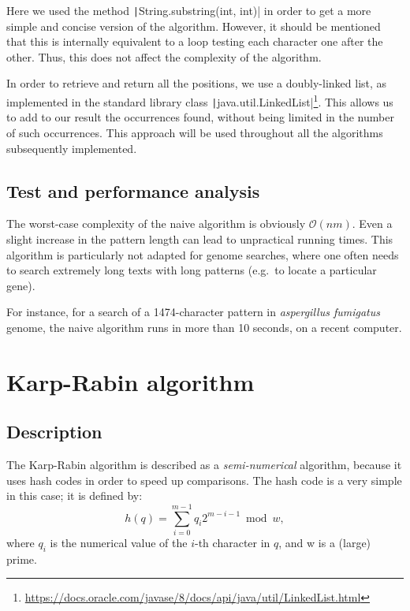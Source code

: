 \documentclass[a4paper,11pt,openany,extrafontsizes,twoside,article]{memoir}
\begin{document}
Here we used the method \texttt|String.substring(int, int)|
in order to get a more simple and concise version of the
algorithm. However, it should be mentioned that this is internally
equivalent to a loop testing each character one after the other. Thus,
this does not affect the complexity of the algorithm.

In order to retrieve and return all the positions, we use a
doubly-linked list, as implemented in the standard library class
\texttt|java.util.LinkedList|\footnote{\url{https://docs.oracle.com/javase/8/docs/api/java/util/LinkedList.html}}. This
allows us to add to our result the occurrences found, without being
limited in the number of such occurrences. This approach will be used
throughout all the algorithms subsequently implemented.

\section{Test and performance analysis}
\label{sec:test-perf-analys}

The worst-case complexity of the naive algorithm is obviously
$\mathcal{O}(nm)$. Even a slight increase in the pattern length can lead to
unpractical running times. This algorithm is particularly not adapted
for genome searches, where one often needs to search extremely long
texts with long patterns (e.g.\ to locate a particular gene).

For instance, for a search of a 1474-character pattern in
\emph{aspergillus fumigatus} genome, the naive algorithm runs in more
than 10 seconds, on a recent computer.


\chapter{Karp-Rabin algorithm}
\label{cha:karp-rabin-algorithm}

\section{Description}
\label{sec:description-1}

The Karp-Rabin algorithm is described as a \emph{semi-numerical}
algorithm, because it uses hash codes in order to speed up
comparisons. The hash code is a very simple in this case; it is
defined by:
\[ h(q) = \sum_{i=0}^{m-1} q_i 2^{m-i-1} \bmod w, \] where $q_i$ is
the numerical value of the $i$-th character in $q$, and w is a (large)
prime.
\end{document}

